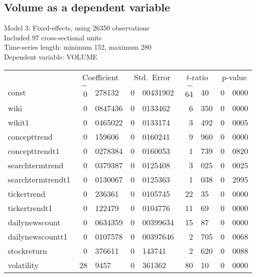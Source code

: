 \subsection{Volume as a dependent variable}
\begin{center}

Model 3: Fixed-effects, using 26350 observations\\
Included 97 cross-sectional units\\
Time-series length: minimum 152, maximum 280\\
Dependent variable: VOLUME\\

\vspace{1em}

\begin{tabular}{lr@{,}lr@{,}lr@{,}lr@{,}l}
  &
 \multicolumn{2}{c}{Coefficient} &
  \multicolumn{2}{c}{Std.\ Error} &
   \multicolumn{2}{c}{$t$-ratio} &
    \multicolumn{2}{c}{p-value} \\[1ex]
const &
  $-$0&278132 &
    0&00431902 &
      $-$64&40 &
        0&0000 \\
wiki &
  0&0847436 &
    0&0133462 &
      6&350 &
        0&0000 \\
wikit1 &
  0&0465022 &
    0&0133174 &
      3&492 &
        0&0005 \\
concepttrend &
  0&159606 &
    0&0160241 &
      9&960 &
        0&0000 \\
concepttrendt1 &
  0&0278384 &
    0&0160053 &
      1&739 &
        0&0820 \\
searchtermtrend &
  0&0379387 &
    0&0125408 &
      3&025 &
        0&0025 \\
searchtermtrendt1 &
  0&0130067 &
    0&0125363 &
      1&038 &
        0&2995 \\
tickertrend &
  0&236361 &
    0&0105745 &
      22&35 &
        0&0000 \\
tickertrendt1 &
  0&122479 &
    0&0104776 &
      11&69 &
        0&0000 \\
dailynewscount &
  0&0634359 &
    0&00399634 &
      15&87 &
        0&0000 \\
dailynewscountt1 &
  0&0107578 &
    0&00397646 &
      2&705 &
        0&0068 \\
stockreturn &
  0&376611 &
    0&143741 &
      2&620 &
        0&0088 \\
volatility &
  28&9457 &
    0&361362 &
      80&10 &
        0&0000 \\
\end{tabular}


\end{center}
